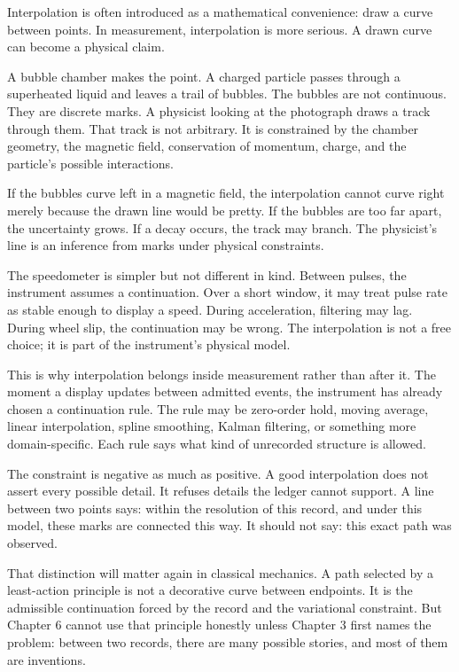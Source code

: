 Interpolation is often introduced as a mathematical convenience: draw a curve
between points. In measurement, interpolation is more serious. A drawn curve
can become a physical claim.

A bubble chamber makes the point. A charged particle passes through a
superheated liquid and leaves a trail of bubbles. The bubbles are not
continuous. They are discrete marks. A physicist looking at the photograph
draws a track through them. That track is not arbitrary. It is constrained by
the chamber geometry, the magnetic field, conservation of momentum, charge, and
the particle's possible interactions.

If the bubbles curve left in a magnetic field, the interpolation cannot curve
right merely because the drawn line would be pretty. If the bubbles are too far
apart, the uncertainty grows. If a decay occurs, the track may branch. The
physicist's line is an inference from marks under physical constraints.

The speedometer is simpler but not different in kind. Between pulses, the
instrument assumes a continuation. Over a short window, it may treat pulse rate
as stable enough to display a speed. During acceleration, filtering may lag.
During wheel slip, the continuation may be wrong. The interpolation is not a
free choice; it is part of the instrument's physical model.

This is why interpolation belongs inside measurement rather than after it. The
moment a display updates between admitted events, the instrument has already
chosen a continuation rule. The rule may be zero-order hold, moving average,
linear interpolation, spline smoothing, Kalman filtering, or something more
domain-specific. Each rule says what kind of unrecorded structure is allowed.

The constraint is negative as much as positive. A good interpolation does not
assert every possible detail. It refuses details the ledger cannot support. A
line between two points says: within the resolution of this record, and under
this model, these marks are connected this way. It should not say: this exact
path was observed.

That distinction will matter again in classical mechanics. A path selected by a
least-action principle is not a decorative curve between endpoints. It is the
admissible continuation forced by the record and the variational constraint.
But Chapter 6 cannot use that principle honestly unless Chapter 3 first names
the problem: between two records, there are many possible stories, and most of
them are inventions.

